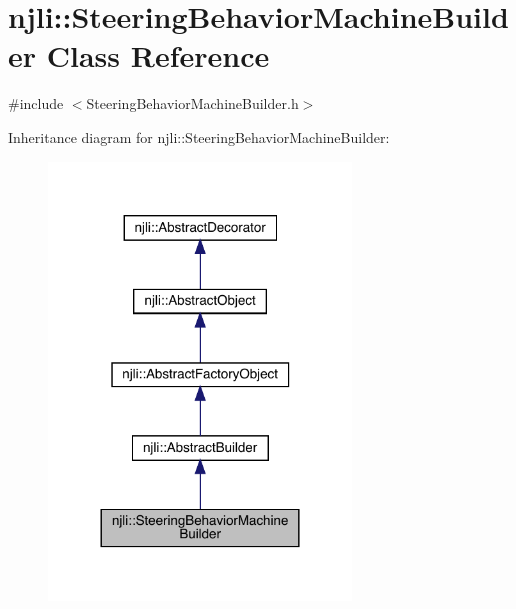\hypertarget{classnjli_1_1_steering_behavior_machine_builder}{}\section{njli\+:\+:Steering\+Behavior\+Machine\+Builder Class Reference}
\label{classnjli_1_1_steering_behavior_machine_builder}


{\ttfamily \#include $<$Steering\+Behavior\+Machine\+Builder.\+h$>$}



Inheritance diagram for njli\+:\+:Steering\+Behavior\+Machine\+Builder\+:\nopagebreak
\begin{figure}[H]
\begin{center}
\leavevmode
\includegraphics[width=228pt]{classnjli_1_1_steering_behavior_machine_builder__inherit__graph}
\end{center}
\end{figure}


